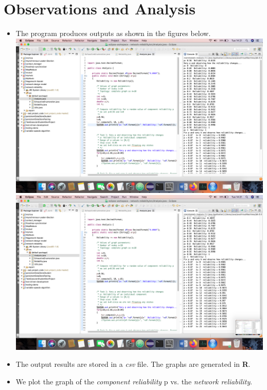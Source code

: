 \documentclass[12pt,letterpaper,titlepage,en-US]{article}
\begin{document}
\section{Observations and Analysis}
\begin{itemize}


\item The program produces outputs as shown in the figures below.\\
 
\includegraphics[scale=0.3]{fig/photo1.png}\\

\includegraphics[scale=0.3]{fig/photo2.png}\\

 
\item The output results are stored in a \textit{csv} file. The graphs are generated in \textbf{R}.

\item We plot the graph of the \textit{component reliability} p vs. the \textit{network reliability}. 


\end{itemize}
\end{document}
